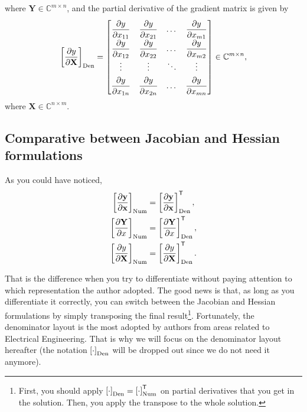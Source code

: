 \documentclass{article}
\newcommand{\trans}{\mathsf{T}}
\begin{document}
where \(\mathbf{Y} \in \mathbb{C}^{m \times n}\), and the partial derivative of the gradient matrix is given by
\begin{align}
    \renewcommand{\arraystretch}{1.8}
			\left[\dfrac{\partial y}{\partial \mathbf{X}}\right]_{\textnormal{Den}} = \begin{bmatrix}
				\dfrac{\partial y}{\partial x_{11}} & \dfrac{\partial y}{\partial x_{21}} & \dots & \dfrac{\partial y}{\partial x_{m1}} \\
				\dfrac{\partial y}{\partial x_{12}} & \dfrac{\partial y}{\partial x_{22}} & \dots & \dfrac{\partial y}{\partial x_{m2}} \\
				\vdots & \vdots & \ddots & \vdots \\
				\dfrac{\partial y}{\partial x_{1n}} & \dfrac{\partial y}{\partial x_{2n}} & \dots & \dfrac{\partial y}{\partial x_{mn}} \\
			\end{bmatrix} \in \mathbb{C}^{m \times n},
\end{align}
where \(\mathbf{X} \in \mathbb{C}^{n \times m}\).

\subsection{Comparative between Jacobian and Hessian formulations}

As you could have noticed,
\begin{align}
    \left[ \dfrac{\partial \mathbf{y}}{\partial \mathbf{x}} \right]_{\textnormal{Num}} & = \left[ \dfrac{\partial \mathbf{y}}{\partial \mathbf{x}} \right]_{\textnormal{Den}}^{\trans}, \\
    \left[ \dfrac{\partial \mathbf{Y}}{\partial x}\right]_{\textnormal{Num}} & = \left[ \dfrac{\partial \mathbf{Y}}{\partial x}\right]_{\textnormal{Den}}^{\trans}, \\
    \left[\dfrac{\partial y}{\partial \mathbf{X}}\right]_{\textnormal{Num}} & = \left[\dfrac{\partial y}{\partial \mathbf{X}}\right]_{\textnormal{Den}}^{\trans}.
\end{align}

That is the difference when you try to differentiate without paying attention to which representation the author adopted. The good news is that, as long as you differentiate it correctly, you can switch between the Jacobian and Hessian formulations by simply transposing the final result\footnote{First, you should apply \(\left[\cdot\right]_{\textnormal{Den}} = \left[\cdot\right]_{\textnormal{Num}}^{\trans}\) on partial derivatives that you get in the solution. Then, you apply the transpose to the whole solution.}. Fortunately, the denominator layout is the most adopted by authors from areas related to Electrical Engineering. That is why we will focus on the denominator layout hereafter (the notation \(\left[\cdot\right]_{\textnormal{Den}}\) will be dropped out since we do not need it anymore).
\end{document}
